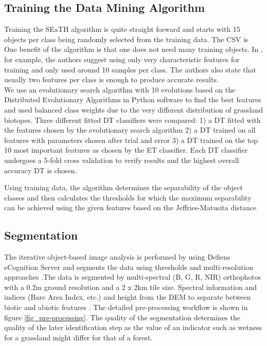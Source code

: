 \documentclass[authoryear, review,12pt,number]{elsarticle}
\begin{document}
\subsection{Training the Data Mining Algorithm}
Training the SEaTH algorithm is quite straight forward and starts with 15 
objects per class being randomly selected from the training data. The CSV is 
One benefit of the algorithm is that one does not need many training objects. In
\cite{Nussbaum2006}, for example, the authors suggest using only very
characteristic features for training and only used around 10 samples per
class. The authors also state that usually two features
per class is enough to produce accurate results.\\
We use an evolutionary search algorithm with 10 evolutions based on the 
Distributed Evolutionary Algorithms in Python \citep{DEAP_JMLR2012} software to 
find the best features and used balanced class weights due to the very 
different distribution of grassland biotopes.  Three different fitted DT 
classifiers were compared: 1) a DT fitted with the features chosen by the 
evolutionary search algorithm 2) a DT trained on all features with parameters 
chosen after trial and error 3) a DT trained on the top 10 most important 
features as chosen by the ET classifier. Each DT classifier undergoes a 5-fold 
cross validation to verify results and the highest overall accuracy DT is 
chosen.


Using training data, the algorithm determines the separability of the object 
classes and then calculates the thresholds for which the maximum separability 
can be achieved using the given features based on the Jeffries-Matusita 
distance 

\subsection{Segmentation} 
\label{subsec_segmentation}
The iterative object-based image analysis is performed by \cite{Tintrup2015} 
using Defiens eCognition Server and segments the data using thresholds and 
multi-resolution approaches \citep{baatz2001ecognition}.The data is segmented 
by multi-spectral (B, G, R, NIR) orthophotos with a 0.2m ground resolution and 
a 2 x 2km tile size. Spectral information and indices (Bare Area Index, etc.) and 
height from the DEM to separate between biotic and abiotic features 
\citep{Tintrup2015}. The detailed pre-processing workflow is 
shown in figure \ref{fig_pre-processing}. The quality of the segmentation
determines the quality of the later identification step as the value of an
indicator such as wetness for a grassland might differ for that of a forest.
\end{document}
